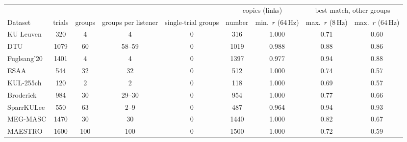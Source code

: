 \begin{tabular}{lcccccccc}\toprule
& & & & & \multicolumn{2}{c}{copies (links)} & \multicolumn{2}{c}{best match, other groups} \\
\cmidrule(lr){6-7}\cmidrule(lr){8-9}
Dataset & trials & groups & groups per listener & single-trial groups & number & min.\ $r$ (64\,Hz) & max.\ $r$ (8\,Hz) & max.\ $r$ (64\,Hz) \\\midrule
KU Leuven & 320 & 4 & 4 & 0 & 316 & 1.000 & 0.71 & 0.60 \\
DTU & 1079 & 60 & 58--59 & 0 & 1019 & 0.988 & 0.88 & 0.86 \\
Fuglsang'20 & 1401 & 4 & 4 & 0 & 1397 & 0.977 & 0.94 & 0.88 \\
ESAA & 544 & 32 & 32 & 0 & 512 & 1.000 & 0.74 & 0.57 \\
KUL-255ch & 120 & 2 & 2 & 0 & 118 & 1.000 & 0.69 & 0.57 \\
Broderick & 984 & 30 & 29--30 & 0 & 954 & 1.000 & 0.77 & 0.66 \\
SparrKULee & 550 & 63 & 2--9 & 0 & 487 & 0.964 & 0.94 & 0.93 \\
MEG-MASC & 1470 & 30 & 30 & 0 & 1440 & 1.000 & 0.82 & 0.67 \\
MAESTRO & 1600 & 100 & 100 & 0 & 1500 & 1.000 & 0.72 & 0.59 \\
\bottomrule\end{tabular}

